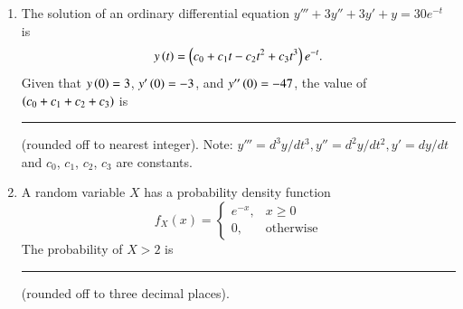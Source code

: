 \documentclass[journal,12pt,onecolumn]{IEEEtran}
\theoremstyle{remark}
\begin{document}
\begin{enumerate}
\item The solution of an ordinary differential equation
$
y''' + 3 y'' + 3 y' + y = 30 e^{-t}
$
is 
$$
y\brak{t} = \brak{c_0 + c_1 t - c_2 t^2 + c_3 t^3}e^{-t}.
$$
Given that $y\brak{0} = 3$, $y'\brak{0} = -3$, and $y''\brak{0} = -47$, the value of $\brak{c_0 + c_1 + c_2 + c_3}$ is \rule{1.5cm}{0.4pt} (rounded off to nearest integer).
Note: $y'''=d^3y/dt^3, y''=d^2y/dt^2, y'=dy/dt$ and $c_0$, $c_1$, $c_2$, $c_3$ are constants.  \par\hfill{}

\item A random variable $X$ has a probability density function
$$
f_X(x) = \begin{cases}
e^{-x}, & x \geq 0 \\
0, & \text{otherwise}
\end{cases}
$$
The probability of $X > 2$ is \rule{1.5cm}{0.4pt} (rounded off to three decimal places).
\par\hfill{}

\end{enumerate}
\end{document}

